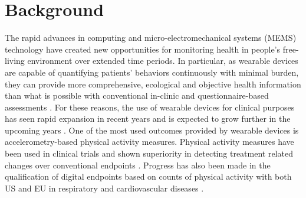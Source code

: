 \documentclass{bmcart}
\begin{document}


\section*{Background}
The rapid advances in computing and micro-electromechanical systems (MEMS)
technology have created new opportunities for monitoring health in people's
free-living environment over extended time periods. In particular, as wearable
devices are capable of quantifying patients’ behaviors continuously with
minimal burden, they can provide more comprehensive, ecological and objective
health information than what is possible with conventional in-clinic and
questionnaire-based assessments \cite{chinapaw_physical_2010,
	lee_validity_2011, van_poppel_physical_2010}. For these reasons, the use of
wearable devices for clinical purposes has seen rapid expansion in recent years
and is expected to grow further in the upcoming years
\cite{strain_wearable-device-measured_2020}. One of the most used outcomes
provided by wearable devices is accelerometry-based physical activity measures.
Physical activity measures have been used in clinical trials and shown
superiority in detecting treatment related changes over conventional
endpoints \cite{nathan_randomized_2020}. Progress has also been made in the
qualification of digital endpoints based on counts of physical activity with
both US and EU in respiratory and cardiovascular diseases
\cite{european_medicines_agency_qualification_2018,
	european_medicines_agency_qualification_2019}.
\end{document}

